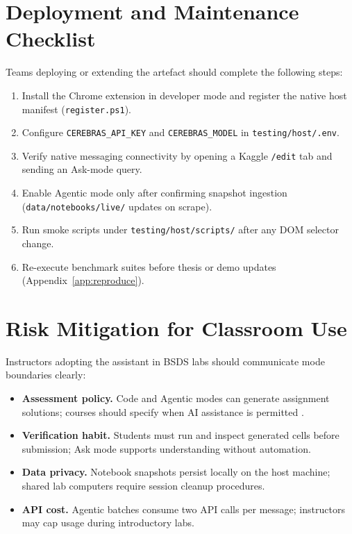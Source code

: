 \section{Deployment and Maintenance Checklist}
\label{sec:deploy-checklist}

Teams deploying or extending the artefact should complete the following steps:

\begin{enumerate}
  \item Install the Chrome extension in developer mode and register the native host manifest (\texttt{register.ps1}).
  \item Configure \texttt{CEREBRAS\_API\_KEY} and \texttt{CEREBRAS\_MODEL} in \texttt{testing/host/.env}.
  \item Verify native messaging connectivity by opening a Kaggle \texttt{/edit} tab and sending an Ask-mode query.
  \item Enable Agentic mode only after confirming snapshot ingestion (\texttt{data/notebooks/live/} updates on scrape).
  \item Run smoke scripts under \texttt{testing/host/scripts/} after any \ac{DOM} selector change.
  \item Re-execute benchmark suites before thesis or demo updates (Appendix~\ref{app:reproduce}).
\end{enumerate}

\section{Risk Mitigation for Classroom Use}
\label{sec:classroom-risks}

Instructors adopting the assistant in \acf{BSDS} labs should communicate mode boundaries clearly:

\begin{itemize}
  \item \textbf{Assessment policy.} Code and Agentic modes can generate assignment solutions; courses should specify when AI assistance is permitted \parencite{finnieansley2022codex}.
  \item \textbf{Verification habit.} Students must run and inspect generated cells before submission; Ask mode supports understanding without automation.
  \item \textbf{Data privacy.} Notebook snapshots persist locally on the host machine; shared lab computers require session cleanup procedures.
  \item \textbf{API cost.} Agentic batches consume two \ac{API} calls per message; instructors may cap usage during introductory labs.
\end{itemize}

